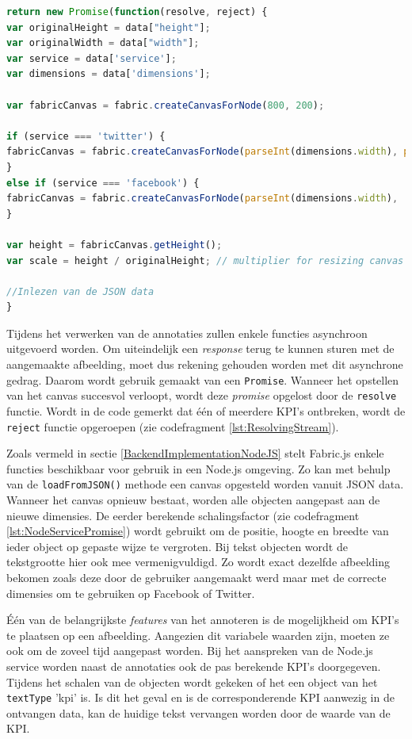 \begin{lstlisting}[caption={renderer.js - Image renderer},label=lst:NodeServicePromise,language=javascript]
return new Promise(function(resolve, reject) {
var originalHeight = data["height"];
var originalWidth = data["width"];
var service = data['service'];
var dimensions = data['dimensions'];

var fabricCanvas = fabric.createCanvasForNode(800, 200);

if (service === 'twitter') {
fabricCanvas = fabric.createCanvasForNode(parseInt(dimensions.width), parseInt(dimensions.height));
}
else if (service === 'facebook') {
fabricCanvas = fabric.createCanvasForNode(parseInt(dimensions.width),  parseInt(dimensions.height));
}

var height = fabricCanvas.getHeight();
var scale = height / originalHeight; // multiplier for resizing canvas + objects

//Inlezen van de JSON data
}
\end{lstlisting}

Tijdens het verwerken van de annotaties zullen enkele functies asynchroon uitgevoerd worden. Om uiteindelijk een \textit{response} terug te kunnen sturen met de aangemaakte afbeelding, moet dus rekening gehouden worden met dit asynchrone gedrag. Daarom wordt gebruik gemaakt van een \texttt{Promise}. Wanneer het opstellen van het canvas succesvol verloopt, wordt deze \textit{promise} opgelost door de \texttt{resolve} functie. Wordt in de code gemerkt dat \'{e}\'{e}n of meerdere KPI's ontbreken, wordt de \texttt{reject} functie opgeroepen (zie codefragment \ref{lst:ResolvingStream}). 

Zoals vermeld in sectie \ref{BackendImplementationNodeJS} stelt Fabric.js enkele functies beschikbaar voor gebruik in een Node.js omgeving. Zo kan met behulp van de \texttt{loadFromJSON()} methode een canvas opgesteld worden vanuit JSON data. Wanneer het canvas opnieuw bestaat, worden alle objecten aangepast aan de nieuwe dimensies. De eerder berekende schalingsfactor (zie codefragment \ref{lst:NodeServicePromise}) wordt gebruikt om de positie, hoogte en breedte van ieder object op gepaste wijze te vergroten. Bij tekst objecten wordt de tekstgrootte hier ook mee vermenigvuldigd. Zo wordt exact dezelfde afbeelding bekomen zoals deze door de gebruiker aangemaakt werd maar met de correcte dimensies om te gebruiken op Facebook of Twitter. 

\'{E}\'{e}n van de belangrijkste \textit{features} van het annoteren is de mogelijkheid om KPI's te plaatsen op een afbeelding. Aangezien dit variabele waarden zijn, moeten ze ook om de zoveel tijd aangepast worden. Bij het aanspreken van de Node.js service worden naast de annotaties ook de pas berekende KPI's doorgegeven. Tijdens het schalen van de objecten wordt gekeken of het een object van het \texttt{textType} 'kpi' is. %
Is dit het geval en is de corresponderende KPI aanwezig in de ontvangen data, kan de huidige tekst vervangen worden door de waarde van de KPI. 
 
